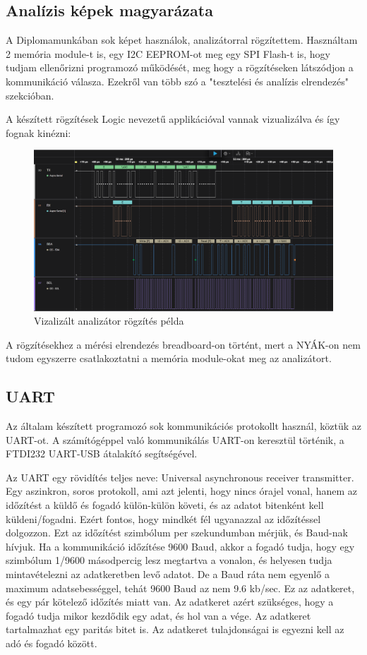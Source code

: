 \documentclass[a4paper,12pt,oneside]{book}
\begin{document}
\subsection{Analízis képek magyarázata}

A Diplomamunkában sok képet használok, analizátorral rögzítettem. Használtam 2 memória module-t is, egy I2C EEPROM-ot meg egy SPI Flash-t is, hogy tudjam ellenőrizni programozó működését, meg hogy a rögzítéseken látszódjon a kommunikáció válasza. Ezekről van több szó a "tesztelési és analízis elrendezés" szekcióban. 

A készített rögzítések Logic nevezetű applikációval vannak vizualizálva és így fognak kinézni:
\begin{figure}[H]
	\centering
	\includegraphics[trim=1mm 1mm 1mm 1mm,scale=0.3]{i2c small read.PNG}
	\caption{Vizalizált analizátor rögzítés példa}
	\label{Vizalizált analizátor rögzítés példa}
\end{figure}

A rögzítésekhez a mérési elrendezés breadboard-on történt, mert a NYÁK-on nem tudom egyszerre csatlakoztatni a memória module-okat meg az analizátort.

\subsection{UART}
Az általam készített programozó sok kommunikációs protokollt használ, köztük az UART-ot. A számítógéppel való kommunikálás UART-on keresztül történik, a FTDI232 UART-USB átalakító segítségével.

Az UART egy rövidítés teljes neve: Universal asynchronous receiver transmitter. Egy aszinkron, soros protokoll, ami azt jelenti, hogy nincs órajel vonal, hanem az időzítést a küldő és fogadó külön-külön követi, és az adatot bitenként kell küldeni/fogadni. Ezért fontos, hogy mindkét fél ugyanazzal az időzítéssel dolgozzon. Ezt az időzítést szimbólum per szekundumban mérjük, és Baud-nak hívjuk. Ha a kommunikáció időzítése 9600 Baud, akkor a fogadó tudja, hogy egy szimbólum 1/9600 másodpercig lesz megtartva a vonalon, és helyesen tudja mintavételezni az adatkeretben levő adatot. De a Baud ráta nem egyenlő a maximum adatsebességgel, tehát 9600 Baud az nem 9.6 kb/sec. Ez az adatkeret, és egy pár kötelező időzítés miatt van. Az adatkeret azért szükséges, hogy a fogadó tudja mikor kezdődik egy adat, és hol van a vége. Az adatkeret tartalmazhat egy paritás bitet is. Az adatkeret tulajdonságai is egyezni kell az adó és fogadó között.
\end{document}
